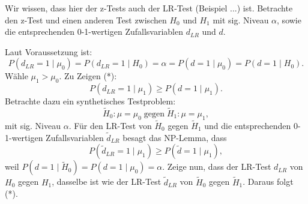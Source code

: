 \documentclass[10pt]{article}
\newcommand{\dlr}{d_{LR}}%
\newenvironment{BWS}[1][]
{\begin{Beweis}[frametitle=#1]}{\end{Beweis}}
\begin{document}
			\begin{BWS}[Beweis 2.1.2 (UMP z-Test)]
			Wir wissen, dass hier der z-Tests auch der LR-Test (Beispiel ...) ist. Betrachte den z-Test und einen anderen Test zwischen $H_0$ und $H_1$ mit sig. Niveau $\alpha$, sowie die entsprechenden 0-1-wertigen Zufallsvariablen $\dlr$ und $d$. 
			
			Laut Voraussetzung ist:
			\begin{equation*}
				P(\dlr = 1 \mid \mu_0) = P(\dlr = 1 \mid H_0) = \alpha = P(d=1 \mid \mu_0) = P(d =1 \mid H_0).
			\end{equation*}
			Wähle $\mu_1 > \mu_0$. Zu Zeigen (*):
			\begin{equation*}
				P(\dlr = 1 \mid \mu_1) \geq P(d=1 \mid \mu_1). 
			\end{equation*}
			Betrachte dazu ein synthetisches Testproblem:
			\begin{equation*}
				\tilde{H}_0: \mu = \mu_0 \; \text{gegen} \; \tilde{H}_1: \mu = \mu_1,
			\end{equation*}
			mit sig. Niveau $\alpha$. Für den LR-Test von $	\tilde{H}_0$ gegen $\tilde{H}_1$ und die entsprechenden 0-1-wertigen Zufallsvariablen $\tilde{d}_{LR}$ besagt das NP-Lemma, dass 
			\begin{equation*}
				P(\tilde{d}_{LR} = 1 \mid \mu_1) \geq P(\tilde{d}=1 \mid \mu_1),
			\end{equation*}
			weil $P(d=1\mid \tilde{H}_0) = P(d=1 \mid \mu_0) = \alpha$. Zeige nun, dass der LR-Test $\dlr$ von $H_0$ gegen $H_1$, dasselbe ist wie der LR-Test $\tilde{d}_{LR}$ von $\tilde{H}_0$ gegen $\tilde{H}_1$. Daraus folgt (*).
			

\end{BWS}
\end{document}
